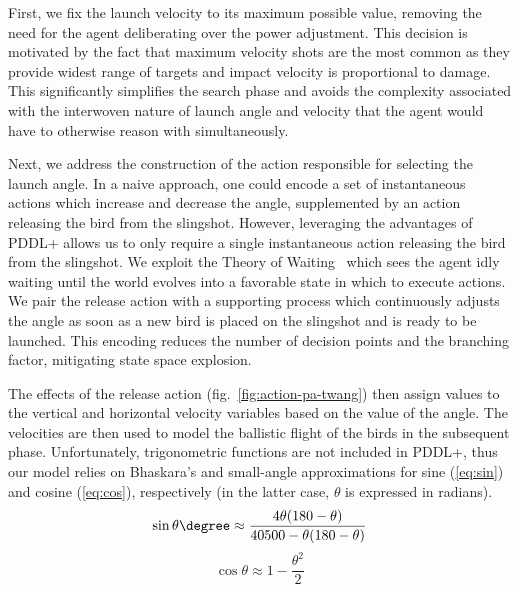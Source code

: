 First, we fix the launch velocity to its maximum possible value, removing the need for the agent deliberating over the power adjustment. This decision is motivated by the fact that maximum velocity shots are the most common as they provide widest range of targets and impact velocity is proportional to damage. This significantly simplifies the search phase and avoids the complexity associated with the interwoven nature of launch angle and velocity that the agent would have to otherwise reason with simultaneously. 

Next, we address the construction of the action responsible for selecting the launch angle. In a naive approach, one could encode a set of instantaneous actions which increase and decrease the angle, supplemented by an action releasing the bird from the slingshot.
However, leveraging the advantages of PDDL+ allows us to only require a single instantaneous action releasing the bird from the slingshot. We exploit the Theory of Waiting~\cite{mcdermott2003reasoning} which sees the agent idly waiting until the world evolves into a favorable state in which to execute actions. We pair the release action with a supporting process which continuously adjusts the angle as soon as a new bird is placed on the slingshot and is ready to be launched. This encoding reduces the number of decision points and the branching factor, mitigating state space explosion.

The effects of the release action (fig.~\ref{fig:action-pa-twang}) then assign values to the vertical and horizontal velocity variables based on the value of the angle. The velocities are then used to model the ballistic flight of the birds in the subsequent phase. Unfortunately, trigonometric functions are not included in PDDL+, thus our model relies on Bhaskara's and small-angle approximations for sine (\ref{eq:sin}) and cosine (\ref{eq:cos}), respectively (in the latter case, $\theta$ is expressed in radians). 
\begin{equation} \label{eq:sin}
\sin \theta \degree \approx \frac{4 \theta(180 - \theta)}{40500 - \theta(180 - \theta)}
\end{equation}
\begin{equation} \label{eq:cos}
\cos \theta \approx 1 - \frac{\theta^2}{2}
\end{equation}


